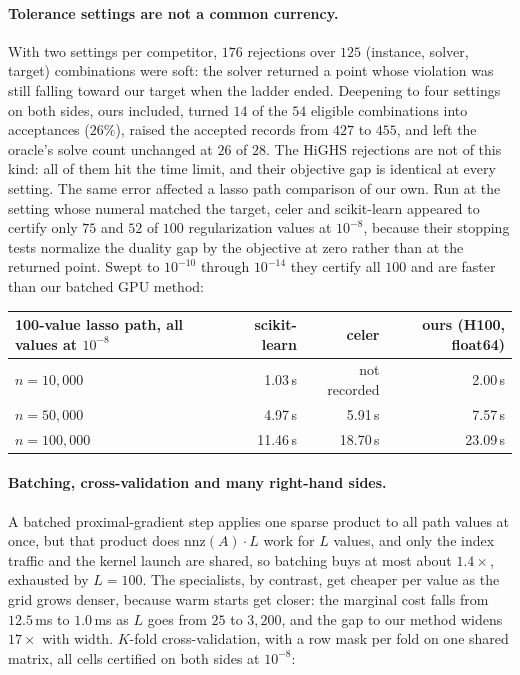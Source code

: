 \documentclass[11pt]{article}
\begin{document}
\paragraph{Tolerance settings are not a common currency.}
With two settings per competitor, $176$ rejections over $125$
(instance, solver, target) combinations were soft: the solver returned a point
whose violation was still falling toward our target when the ladder ended.
Deepening to four settings on both sides, ours included, turned $14$ of the
$54$ eligible combinations into acceptances ($26\%$), raised the accepted
records from $427$ to $455$, and left the oracle's solve count unchanged at
$26$ of $28$. The HiGHS rejections are not of this kind: all of them hit the
time limit, and their objective gap is identical at every setting. The same
error affected a lasso path comparison of our own. Run at the setting whose
numeral matched the target, celer and scikit-learn appeared to certify only
$75$ and $52$ of $100$ regularization values at $10^{-8}$, because their
stopping tests normalize the duality gap by the objective at zero rather than
at the returned point. Swept to $10^{-10}$ through $10^{-14}$ they certify all
$100$ and are faster than our batched GPU method:

\begin{center}
\small
\begin{tabular}{lrrr}
\toprule
100-value lasso path, all values at $10^{-8}$ & scikit-learn & celer & ours (H100, float64) \\
\midrule
$n = 10{,}000$ & 1.03\,s & not recorded & 2.00\,s \\
$n = 50{,}000$ & 4.97\,s & 5.91\,s & 7.57\,s \\
$n = 100{,}000$ & 11.46\,s & 18.70\,s & 23.09\,s \\
\bottomrule
\end{tabular}
\end{center}

\paragraph{Batching, cross-validation and many right-hand sides.}
A batched proximal-gradient step applies one sparse product to all path values
at once, but that product does $\mathrm{nnz}(A) \cdot L$ work for $L$ values, and
only the index traffic and the kernel launch are shared, so batching buys at
most about $1.4\times$, exhausted by $L = 100$. The specialists, by contrast, get
cheaper per value as the grid grows denser, because warm starts get closer:
the marginal cost falls from $12.5$\,ms to $1.0$\,ms as $L$ goes from $25$ to
$3{,}200$, and the gap to our method widens $17\times$ with width. $K$-fold
cross-validation, with a row mask per fold on one shared matrix, all cells
certified on both sides at $10^{-8}$:
\end{document}
